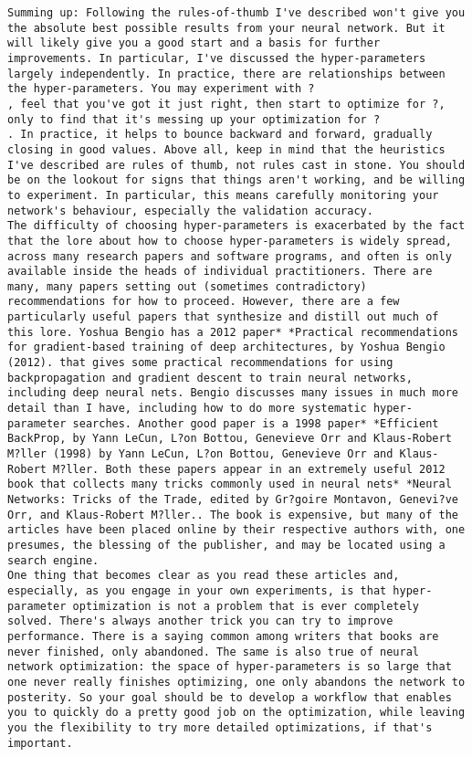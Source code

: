\begin{lstlisting}
Summing up: Following the rules-of-thumb I've described won't give you the absolute best possible results from your neural network. But it will likely give you a good start and a basis for further improvements. In particular, I've discussed the hyper-parameters largely independently. In practice, there are relationships between the hyper-parameters. You may experiment with ?
, feel that you've got it just right, then start to optimize for ?, only to find that it's messing up your optimization for ?
. In practice, it helps to bounce backward and forward, gradually closing in good values. Above all, keep in mind that the heuristics I've described are rules of thumb, not rules cast in stone. You should be on the lookout for signs that things aren't working, and be willing to experiment. In particular, this means carefully monitoring your network's behaviour, especially the validation accuracy.
The difficulty of choosing hyper-parameters is exacerbated by the fact that the lore about how to choose hyper-parameters is widely spread, across many research papers and software programs, and often is only available inside the heads of individual practitioners. There are many, many papers setting out (sometimes contradictory) recommendations for how to proceed. However, there are a few particularly useful papers that synthesize and distill out much of this lore. Yoshua Bengio has a 2012 paper* *Practical recommendations for gradient-based training of deep architectures, by Yoshua Bengio (2012). that gives some practical recommendations for using backpropagation and gradient descent to train neural networks, including deep neural nets. Bengio discusses many issues in much more detail than I have, including how to do more systematic hyper-parameter searches. Another good paper is a 1998 paper* *Efficient BackProp, by Yann LeCun, L?on Bottou, Genevieve Orr and Klaus-Robert M?ller (1998) by Yann LeCun, L?on Bottou, Genevieve Orr and Klaus-Robert M?ller. Both these papers appear in an extremely useful 2012 book that collects many tricks commonly used in neural nets* *Neural Networks: Tricks of the Trade, edited by Gr?goire Montavon, Genevi?ve Orr, and Klaus-Robert M?ller.. The book is expensive, but many of the articles have been placed online by their respective authors with, one presumes, the blessing of the publisher, and may be located using a search engine.
One thing that becomes clear as you read these articles and, especially, as you engage in your own experiments, is that hyper-parameter optimization is not a problem that is ever completely solved. There's always another trick you can try to improve performance. There is a saying common among writers that books are never finished, only abandoned. The same is also true of neural network optimization: the space of hyper-parameters is so large that one never really finishes optimizing, one only abandons the network to posterity. So your goal should be to develop a workflow that enables you to quickly do a pretty good job on the optimization, while leaving you the flexibility to try more detailed optimizations, if that's important.

\end{lstlisting}
